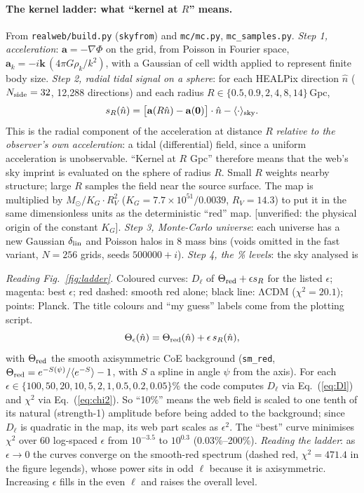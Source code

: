 \documentclass[10pt,twocolumn]{article}
\newcommand{\flag}[1]{\textsf{[unverified: #1]}}
\begin{document}
\paragraph{The kernel ladder: what ``kernel at $R$'' means.} From \texttt{realweb/build.py} (\texttt{skyfrom}) and \texttt{mc/mc.py}, \texttt{mc\_samples.py}. \emph{Step 1, acceleration}: $\mathbf a=-\nabla\Phi$ on the grid, from Poisson in Fourier space, $\mathbf a_k=-i\mathbf k\,(4\pi G\rho_k/k^2)$, with a Gaussian of cell width applied to represent finite body size. \emph{Step 2, radial tidal signal on a sphere}: for each HEALPix direction $\hat n$ ($N_{\rm side}=32$, 12{,}288 directions) and each radius $R\in\{0.5,0.9,2,4,8,14\}$\,Gpc,
\begin{equation}
s_R(\hat n)=\big[\mathbf a(R\hat n)-\mathbf a(\mathbf 0)\big]\cdot\hat n-\langle\cdot\rangle_{\rm sky}.
\end{equation}
This is the radial component of the acceleration at distance $R$ \emph{relative to the observer's own acceleration}: a tidal (differential) field, since a uniform acceleration is unobservable. ``Kernel at $R$ Gpc'' therefore means that the web's sky imprint is evaluated on the sphere of radius $R$. Small $R$ weights nearby structure; large $R$ samples the field near the source surface. The map is multiplied by $M_\odot/K_G\cdot R_V^2$ ($K_G=7.7\times10^{51}/0.0039$, $R_V=14.3$) to put it in the same dimensionless units as the deterministic ``red'' map. \flag{the physical origin of the constant $K_G$}. \emph{Step 3, Monte-Carlo universe}: each universe has a new Gaussian $\delta_{\rm lin}$ and Poisson halos in 8 mass bins (voids omitted in the fast variant, $N=256$ grids, seeds $500000+i$). \emph{Step 4, the \% levels}: the sky analysed is

\noindent\emph{Reading Fig.~\ref{fig:ladder}.} Coloured curves: $D_\ell$ of $\Theta_{\rm red}+\epsilon s_R$ for the listed $\epsilon$; magenta: best $\epsilon$; red dashed: smooth red alone; black line: ΛCDM ($\chi^2=20.1$); points: Planck. The title colours and ``my guess'' labels come from the plotting script.
\begin{equation}
\Theta_\epsilon(\hat n)=\Theta_{\rm red}(\hat n)+\epsilon\,s_R(\hat n),
\end{equation}
with $\Theta_{\rm red}$ the smooth axisymmetric CoE background (\texttt{sm\_red}, $\Theta_{\rm red}=e^{-S(\psi)}/\langle e^{-S}\rangle-1$, with $S$ a spline in angle $\psi$ from the axis). For each $\epsilon\in\{100,50,20,10,5,2,1,0.5,0.2,0.05\}\%$ the code computes $D_\ell$ via Eq.~(\ref{eq:Dl}) and $\chi^2$ via Eq.~(\ref{eq:chi2}). So ``10\%'' means the web field is scaled to one tenth of its natural (strength-1) amplitude before being added to the background; since $D_\ell$ is quadratic in the map, its web part scales as $\epsilon^2$. The ``best'' curve minimises $\chi^2$ over 60 log-spaced $\epsilon$ from $10^{-3.5}$ to $10^{0.3}$ (0.03\%--200\%). \emph{Reading the ladder}: as $\epsilon\to0$ the curves converge on the smooth-red spectrum (dashed red, $\chi^2=471.4$ in the figure legends), whose power sits in odd $\ell$ because it is axisymmetric. Increasing $\epsilon$ fills in the even $\ell$ and raises the overall level.
\end{document}
